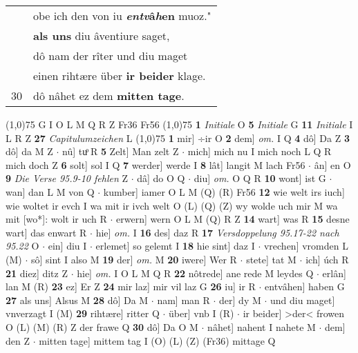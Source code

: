\documentclass[8pt,a4paper,notitlepage]{article}
\begin{document}
\begin{table}[ht]
\begin{minipage}[t]{0.5\linewidth}
\begin{tabular}{rl}
 & obe ich den von iu \textbf{\textit{entv}â\textit{h}en} muoz."\\ 
 & \textbf{als uns} diu âventiure saget,\\ 
 & dô nam der rîter und diu maget\\ 
 & einen rihtære über \textbf{ir beider} klage.\\ 
30 & dô nâhet ez dem \textbf{mitten tage}.\\ 
\end{tabular}
\scriptsize
\line(1,0){75} \newline
G I O L M Q R Z Fr36 Fr56 \newline
\line(1,0){75} \newline
\textbf{1} \textit{Initiale} O  \textbf{5} \textit{Initiale} G  \textbf{11} \textit{Initiale} I L R Z  \textbf{27} \textit{Capitulumzeichen} L  \newline
\line(1,0){75} \newline
\textbf{1} mir] ÷ir O \textbf{2} dem] \textit{om.} I Q \textbf{4} dô] Da Z \textbf{3} dô] da M Z  $\cdot$ nû] tuͦ R \textbf{5} Zelt] Man zelt Z  $\cdot$ mich] mich nu I mich noch L Q R mich doch Z \textbf{6} solt] sol I Q \textbf{7} werder] werde I \textbf{8} lât] langit M lach Fr56  $\cdot$ ân] en O \textbf{9} \textit{Die Verse 95.9-10 fehlen} Z   $\cdot$ dâ] do O Q  $\cdot$ diu] \textit{om.} O Q R \textbf{10} wont] ist G  $\cdot$ wan] dan L M von Q  $\cdot$ kumber] iamer O L M (Q) (R) Fr56 \textbf{12} wie welt irs iuch] wie woltet ir evch I wa mit ir ivch welt O (L) (Q) (Z) wy wolde uch mir M wa mit [wo*]: wolt ir uch R  $\cdot$ erwern] wern O L M (Q) R Z \textbf{14} wart] was R \textbf{15} desne wart] das enwart R  $\cdot$ hie] \textit{om.} I \textbf{16} des] daz R \textbf{17} \textit{Versdoppelung 95.17-22 nach 95.22} O   $\cdot$ ein] diu I  $\cdot$ erlemet] so gelemt I \textbf{18} hie sint] daz I  $\cdot$ vrechen] vromden L (M)  $\cdot$ sô] sint I also M \textbf{19} der] \textit{om.} M \textbf{20} iwere] Wer R  $\cdot$ stete] tat M  $\cdot$ ich] úch R \textbf{21} diez] ditz Z  $\cdot$ hie] \textit{om.} I O L M Q R \textbf{22} nôtrede] ane rede M leydes Q  $\cdot$ erlân] lan M (R) \textbf{23} ez] Er Z \textbf{24} mir laz] mir vil laz G \textbf{26} iu] ir R  $\cdot$ entvâhen] haben G \textbf{27} als uns] Alsus M \textbf{28} dô] Da M  $\cdot$ nam] man R  $\cdot$ der] dy M  $\cdot$ und diu maget] vnverzagt I (M) \textbf{29} rihtære] ritter Q  $\cdot$ über] vnb I (R)  $\cdot$ ir beider] >der< frowen O (L) (M) (R) Z der frawe Q \textbf{30} dô] Da O M  $\cdot$ nâhet] nahent I nahete M  $\cdot$ dem] den Z  $\cdot$ mitten tage] mittem tag I (O) (L) (Z) (Fr36) mittage Q \newline

\end{minipage}
\end{table}
\end{document}
